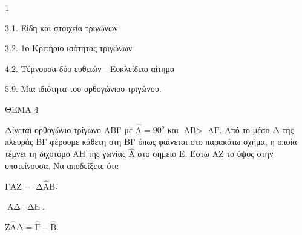 \begin{ylh}{1}
    \item 3.1. Είδη και στοιχεία τριγώνων
    \item 3.2. 1ο Κριτήριο ισότητας τριγώνων
    \item 4.2. Τέμνουσα δύο ευθειών - Ευκλείδειο αίτημα
    \item 5.9. Μια ιδιότητα του ορθογώνιου τριγώνου.
\end{ylh}

ΘΕΜΑ 4

Δίνεται ορθογώνιο τρίγωνο ΑΒΓ με $\widehat{\text{Α}} = 90^{ο}$ και $\text{ΑΒ} >$ $\text{ΑΓ}$. Από το μέσο Δ της πλευράς ΒΓ φέρουμε κάθετη στη ΒΓ όπως φαίνεται στο παρακάτω σχήμα, η οποία τέμνει τη διχοτόμο ΑΗ της γωνίας $\widehat{\text{Α}}$ στο σημείο Ε. Έστω ΑΖ το ύψος στην υποτείνουσα. Να αποδείξετε ότι:

\begin{alist}
\item $\text{Γ}\widehat{\text{Α}}\text{Ζ} =$ $\text{Δ}\widehat{\text{Α}}\text{Β}$.


\item $\text{ΑΔ} = \text{ΔΕ}$.


\item $\text{Ζ}\widehat{\text{Α}}\text{Δ} = \widehat{\text{Γ}} - \widehat{\text{Β}}$.



\end{alist}
